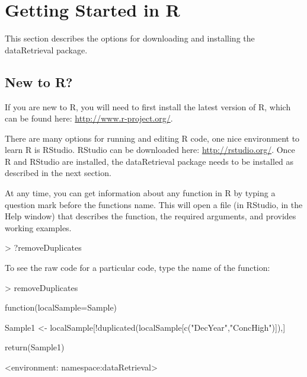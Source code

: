 \documentclass[a4paper,11pt]{article}
\begin{document}
\clearpage
\appendix
\section{Getting Started in R}
\label{sec:appendix1}
This section describes the options for downloading and installing the dataRetrieval package.

\subsection{New to R?}
If you are new to R, you will need to first install the latest version of R, which can be found here: \url{http://www.r-project.org/}.

There are many options for running and editing R code, one nice environment to learn R is RStudio. RStudio can be downloaded here: \url{http://rstudio.org/}. Once R and RStudio are installed, the dataRetrieval package needs to be installed as described in the next section.

At any time, you can get information about any function in R by typing a question mark before the functions name.  This will open a file (in RStudio, in the Help window) that describes the function, the required arguments, and provides working examples.

\begin{Schunk}
\begin{Sinput}
> ?removeDuplicates
\end{Sinput}
\end{Schunk}

To see the raw code for a particular code, type the name of the function:
\begin{Schunk}
\begin{Sinput}
> removeDuplicates
\end{Sinput}
\begin{Soutput}
function(localSample=Sample) {  
  Sample1 <- localSample[!duplicated(localSample[c("DecYear","ConcHigh")]),]
  
  return(Sample1)
}
<environment: namespace:dataRetrieval>
\end{Soutput}
\end{Schunk}


\end{document}
